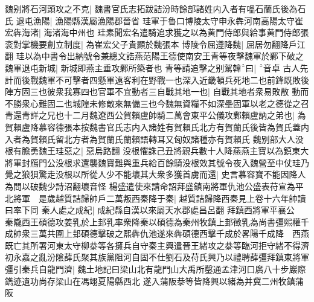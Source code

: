 魏别將石河頭攻之不克|{
	魏書官氏志拓跋詰汾時餘部諸姓内入者有嗢石蘭氏後為石氏}
退屯漁陽|{
	漁陽縣漢屬漁陽郡晉省}
珪軍于魯口博陵太守申永犇河南高陽太守崔宏犇海渚|{
	海渚海中州也}
珪素聞宏名遣騎追求獲之以為黄門侍郎與給事黄門侍郎張衮對掌機要創立制度|{
	為崔宏父子貴顯於魏張本}
博陵令屈遵降魏|{
	屈居勿翻降戶江翻}
珪以為中書令出納號令兼總文誥燕范陽王德使南安王青等夜擊魏軍於鄴下破之魏軍退屯新城|{
	新城即燕主垂攻鄴所築者也}
青等請追擊之别駕韓曰|{
	音卓}
古人先計而後戰魏軍不可擊者四懸軍遠客利在野戰一也深入近畿頓兵死地二也前鋒既敗後陣方固三也彼衆我寡四也官軍不宜動者三自戰其地一也|{
	自戰其地者衆易敗散}
動而不勝衆心難固二也城隍未修敵來無備三也今魏無資糧不如深壘固軍以老之德從之召青還青詳之兄也十二月魏遼西公賀賴盧帥騎二萬會東平公儀攻鄴賴盧訥之弟也|{
	為賀賴盧降慕容德張本按魏書官氏志内入諸姓有賀賴氏北方有賀蘭氏後皆為賀氏蓋内入者為賀賴氏留北方者為賀蘭氏蘭賴語轉耳又匈奴諸種亦有賀賴氏}
魏别部大人没根有膽勇魏王珪惡之|{
	惡烏路翻}
没根懼誅己丑將親兵數十人降燕燕主寶以為鎮東大將軍封鴈門公没根求還襲魏寶難與重兵給百餘騎没根效其號令夜入魏營至中仗珪乃覺之狼狽驚走没根以所從人少不能壞其大衆多獲首虜而還|{
	史言慕容寶不能因降人為問以破魏少詩沼翻壞音怪}
楊盛遣使來請命詔拜盛鎮南將軍仇池公盛表苻宣為平北將軍　是歲越質詰歸帥戶二萬叛西秦降于秦|{
	越質詰歸降西秦見上卷十六年帥讀曰率下同}
秦人處之成紀|{
	成紀縣自漢以來屬天水郡處昌呂翻}
拜鎮西將軍平襄公　秦隴西王碩德攻姜乳於上邽乳率衆降秦以碩德為秦州牧鎮上邽徵乳為尚書彊熙權千成帥衆三萬共圍上邽碩德擊破之熙犇仇池遂來犇碩德西擊千成於畧陽千成降　西燕既亡其所署河東太守柳㳟等各擁兵自守秦主興遣晉王緒攻之㳟等臨河拒守緒不得濟初永嘉之亂汾隂薛氏聚其族黨阻河自固不仕劉石及苻氏興乃以禮聘薛彊拜鎮東將軍彊引秦兵自龍門濟|{
	魏土地記曰梁山北有龍門山大禹所鑿通孟津河口廣八十步巖際鐫迹遺功尚存梁山在馮翊夏陽縣西北}
遂入蒲阪㳟等皆降興以緒為并冀二州牧鎮蒲阪


